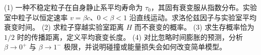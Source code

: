 (1) 一种不稳定粒子在自身静止系平均寿命为 \(\tau_0\)，其固有衰变服从指数分布。实验室中粒子以恒定速率 \(v=\beta c\)、\(0<\beta<1\) 沿直线运动。求洛伦兹因子与实验室平均衰变时间。
(2) 求粒子穿越实验室距离 \(H\) 而不衰变的概率。
(3) 求生存概率恰为 \(1/2\) 时的传播距离，定义平均衰变长度。
(4) 对比忽略时间膨胀的预测，分析 \(\beta\to0^+\) 与 \(\beta\to1^-\) 极限，并说明碰撞或能量损失会如何改变简单模型。
